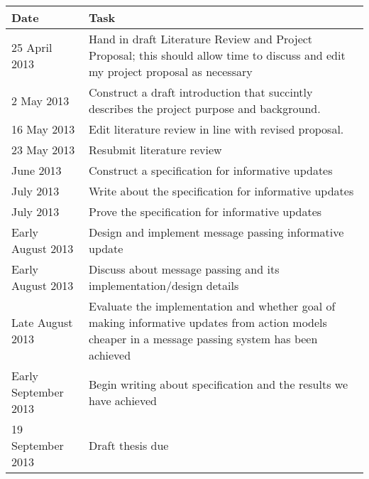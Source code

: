 \documentclass[12pt, a4paper]{article}
\begin{document}
\begin{center}
	\begin{tabular}{ | l | p{10cm} |}
		\hline
		Date & Task \\
		\hline
		25 April 2013 & Hand in draft Literature Review and Project Proposal;
    this should allow time to discuss and edit my project proposal as necessary\\
		\hline
		2 May 2013 & Construct a draft introduction that succintly describes the project purpose and background.\\
		\hline
		16 May 2013 & Edit literature review in line with revised proposal.\\
		\hline
		23 May 2013 & Resubmit literature review \\
		\hline
		June 2013 & Construct a specification for informative updates \\
		\hline
		July 2013 & Write about the specification for informative updates \\
		\hline
		July 2013 & Prove the specification for informative updates \\
		\hline
		Early August 2013 & Design and implement message passing informative update \\
		\hline
		Early August 2013 & Discuss about message passing and its implementation/design details \\
		\hline
		Late August 2013 & Evaluate the implementation and whether goal of making informative updates from action models cheaper in a message passing system has been achieved\\
		\hline
		Early September 2013 & Begin writing about specification and the results we have achieved \\
		\hline
		19 September 2013 & Draft thesis due \\
		\hline
	\end{tabular}
\end{center}





\end{document}
